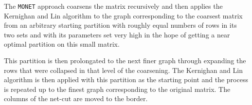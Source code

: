 \begin{rmk}
  The \texttt{MONET} approach coarsens the matrix recursively and then applies
the Kernighan and Lin algorithm to the graph
corresponding to the coarsest matrix from an arbitrary starting partition with
roughly equal numbers of rows in its two sets and with its parameters set very
high in the hope of getting a near optimal partition on this small
matrix.

This partition is then prolongated to the next finer graph through expanding the
rows that were collapsed in that level of the coarsening. The Kernighan and Lin
algorithm is then applied with this partition as the starting point
and the process is repeated up to the finest graph corresponding to the original
matrix. The columns of the net-cut are moved to the border.
\end{rmk}

